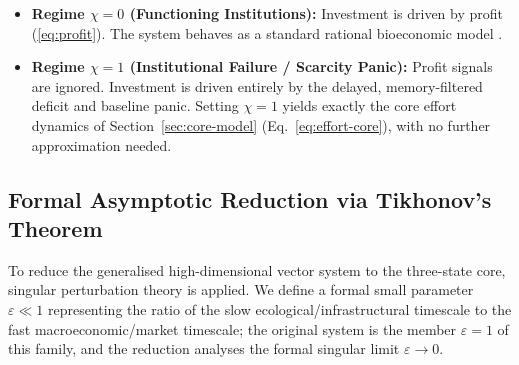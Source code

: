 \documentclass[twocolumn,10pt]{article}
\begin{document}
\begin{itemize}
\item \textbf{Regime \(\chi = 0\) (Functioning Institutions):} Investment is driven by profit (\ref{eq:profit}). The system behaves as a standard rational bioeconomic model \cite{clark1976}.
\item \textbf{Regime \(\chi = 1\) (Institutional Failure / Scarcity Panic):} Profit signals are ignored. Investment is driven entirely by the delayed, memory-filtered deficit and baseline panic. Setting \(\chi = 1\) yields exactly the core effort dynamics of Section~\ref{sec:core-model} (Eq.~\eqref{eq:effort-core}), with no further approximation needed.
\end{itemize}

\subsection{Formal Asymptotic Reduction via Tikhonov's Theorem}
\label{sec:asymptotic-reduction}
To reduce the generalised high-dimensional vector system to the three-state core, singular perturbation theory \cite{tikhonov1952} is applied. We define a formal small parameter \(\varepsilon \ll 1\) representing the ratio of the slow ecological/infrastructural timescale to the fast macroeconomic/market timescale; the original system is the member \(\varepsilon=1\) of this family, and the reduction analyses the formal singular limit \(\varepsilon\to0\).
\end{document}
